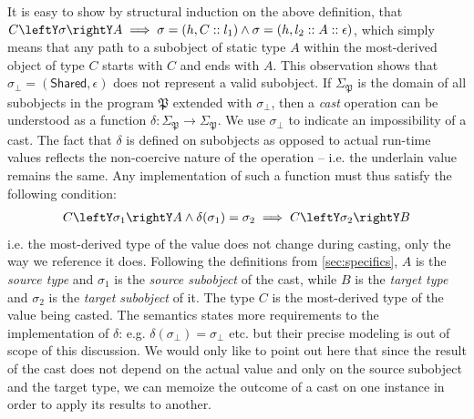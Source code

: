 It is easy to show by structural induction on the above definition, that 
$C\leftY\sigma\rightY A \implies \sigma=(h,C::l_1) \wedge \sigma=(h,l_2::A::\epsilon)$, 
which simply means that any path to a subobject of static type $A$ within the 
most-derived object of type $C$ starts with $C$ and ends with $A$. This 
observation shows that $\sigma_\bot = (\mathsf{Shared},\epsilon)$ does not 
represent a valid subobject. If $\Sigma_\mathfrak{P}$ is the domain of all subobjects in 
the program $\mathfrak{P}$ extended with $\sigma_\bot$, then a \emph{cast} operation can be 
understood as a function $\delta : \Sigma_\mathfrak{P} \rightarrow \Sigma_\mathfrak{P}$. We use 
$\sigma_\bot$ to indicate an impossibility of a cast. The fact that $\delta$ is 
defined on subobjects as opposed to actual run-time values reflects the 
non-coercive nature of the operation -- i.e. the underlain value remains the 
same. Any implementation of such a function must thus satisfy the following 
condition:
\begin{eqnarray*}
C \leftY\sigma_1\rightY A \wedge \delta(\sigma_1) = \sigma_2 \implies C \leftY\sigma_2\rightY B
\end{eqnarray*}
\noindent
i.e. the most-derived type of the value does not change during casting, only the way 
we reference it does. Following the definitions from 
\textsection\ref{sec:specifics}, $A$ is the \emph{source type} and $\sigma_1$ is 
the \emph{source subobject} of the cast, while $B$ is the \emph{target type} and 
$\sigma_2$ is the \emph{target subobject} of it. The type $C$ is the 
most-derived type of the value being casted. The \Cpp{} semantics states more 
requirements to the implementation of $\delta$: e.g. 
$\delta(\sigma_\bot) = \sigma_\bot$ etc. but their precise modeling is out of 
scope of this discussion. We would only like to point out here that since 
the result of the cast does not depend on the actual value and only on the 
source subobject and the target type, we can memoize the outcome of a cast on 
one instance in order to apply its results to another.

